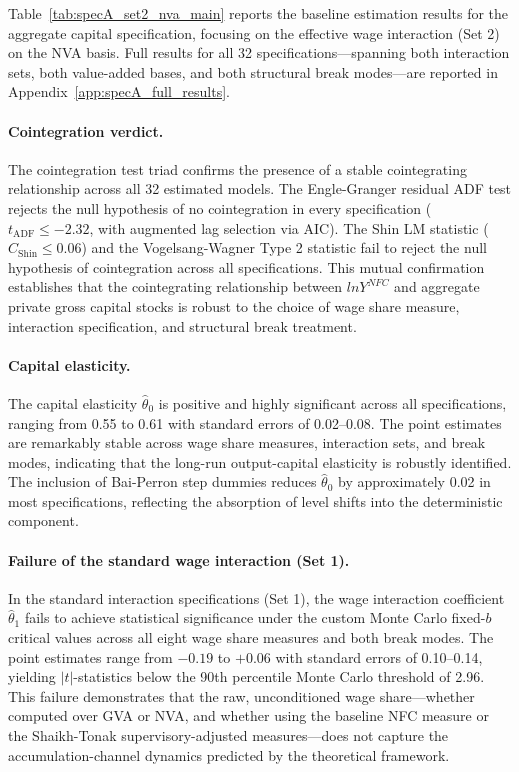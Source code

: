 
Table~\ref{tab:specA_set2_nva_main} reports the baseline estimation
results for the aggregate capital specification, focusing on the
effective wage interaction (Set 2) on the NVA basis. Full results
for all 32 specifications---spanning both interaction sets, both
value-added bases, and both structural break modes---are reported
in Appendix~\ref{app:specA_full_results}.

\paragraph{Cointegration verdict.}
The cointegration test triad confirms the presence of a stable
cointegrating relationship across all 32 estimated models. The
Engle-Granger residual ADF test rejects the null hypothesis of no
cointegration in every specification ($t_{\text{ADF}} \leq -2.32$,
with augmented lag selection via AIC). The Shin
\citeyearpar{Shin1994} LM statistic ($C_{\text{Shin}} \leq 0.06$)
and the Vogelsang-Wagner Type 2 statistic fail to reject the null
hypothesis of cointegration across all specifications. This mutual
confirmation establishes that the cointegrating relationship between
$lnY^{NFC}$ and aggregate private gross capital stocks is robust to the
choice of wage share measure, interaction specification, and
structural break treatment.

\paragraph{Capital elasticity.}
The capital elasticity $\hat{\theta}_0$ is positive and highly
significant across all specifications, ranging from 0.55 to 0.61
with standard errors of 0.02--0.08. The point estimates are
remarkably stable across wage share measures, interaction sets, and
break modes, indicating that the long-run output-capital elasticity
is robustly identified. The inclusion of Bai-Perron step dummies
reduces $\hat{\theta}_0$ by approximately 0.02 in most
specifications, reflecting the absorption of level shifts into the
deterministic component.

\paragraph{Failure of the standard wage interaction (Set 1).}
In the standard interaction specifications (Set 1), the wage
interaction coefficient $\hat{\theta}_1$ fails to achieve
statistical significance under the custom Monte Carlo fixed-$b$
critical values across all eight wage share measures and both break
modes. The point estimates range from $-0.19$ to $+0.06$ with
standard errors of 0.10--0.14, yielding $|t|$-statistics below the
90th percentile Monte Carlo threshold of 2.96. This failure
demonstrates that the raw, unconditioned wage share---whether
computed over GVA or NVA, and whether using the baseline NFC measure
or the Shaikh-Tonak supervisory-adjusted measures---does not capture
the accumulation-channel dynamics predicted by the theoretical
framework.

